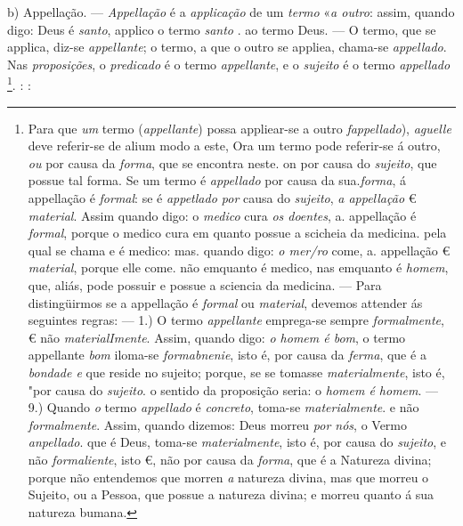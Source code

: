 b) Appellação. --- \emph{Appellação} é a \emph{applicação} de um \emph{termo} «\emph{a outro}: assim, quando digo: Deus é \emph{santo}, applico o termo \emph{santo} . ao termo Deus. --- O termo, que se applica, diz-se \emph{appellante}; o termo, a que o outro se appliea, chama-se \emph{appellado}. Nas \emph{proposições}, o \emph{predicado} é o termo \emph{appellante}, e o \emph{sujeito} é o termo \emph{appellado} \footnote{Para que \emph{um} termo (\emph{appellante}) possa appliear-se a outro \emph{fappellado}), \emph{aguelle} deve referir-se de alium modo a este, Ora um termo pode referir-se á outro, \emph{ou} por causa da \emph{forma}, que se encontra neste. on por causa do \emph{sujeito}, que possue tal forma. Se um termo é \emph{appellado} por causa da sua.\emph{forma}, á appellação é \emph{formal}: se é \emph{appetlado por} causa do \emph{sujeito}, \emph{a appellação} € \emph{material}. Assim quando digo: o \emph{medico} cura \emph{os doentes}, a. appellação é \emph{formal}, porque o medico cura em quanto possue a scicheia da medicina. pela qual se chama e é medico: mas. quando digo: \emph{o mer/ro} come, a. appellação € \emph{material}, porque elle come. não emquanto é medico, nas emquanto é \emph{homem}, que, aliás, pode possuir e possue a sciencia da medicina. --- Para distingüirmos se a appellação é \emph{formal} ou \emph{material}, devemos attender ás seguintes regras: --- 1.) O termo \emph{appellante} emprega-se sempre \emph{formalmente}, € não \emph{materialImente}. Assim, quando digo: \emph{o homem é bom}, o termo appellante \emph{bom} iloma-se \emph{formabnenie}, isto é, por causa da \emph{ferma}, que é a \emph{bondade e} que reside no sujeito; porque, se se tomasse \emph{materialmente}, isto é, "por causa do \emph{sujeito}. o sentido da proposição seria: o \emph{homem é homem}. --- 9.) Quando \emph{o} termo \emph{appellado} é \emph{concreto}, toma-se \emph{materialmente}. e não \emph{formalmente}. Assim, quando dizemos: Deus morreu \emph{por nós}, o Vermo \emph{anpellado}. que é Deus, toma-se \emph{materialmente}, isto é, por causa do \emph{sujeito}, e não \emph{formaliente}, isto €, não por causa da \emph{forma}, que é a Natureza divina; porque não entendemos que morren \emph{a} natureza divina, mas que morreu o Sujeito, ou a Pessoa, que possue a natureza divina; e morreu quanto á sua natureza bumana.}. : \textbar{} :

